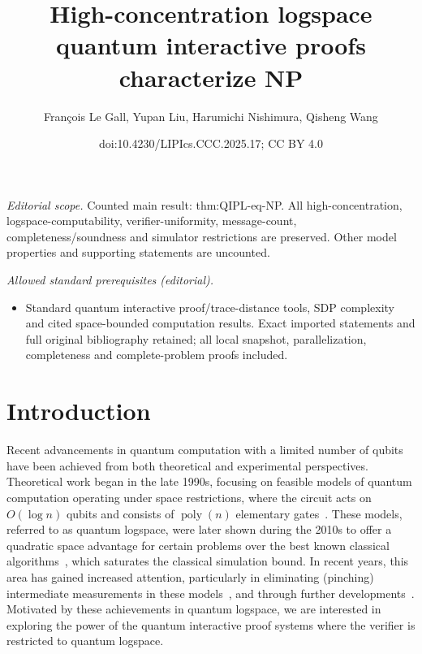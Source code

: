 \documentclass[10pt,a4paper]{article}
\title{High-concentration logspace quantum interactive proofs characterize NP}
\author{François Le Gall, Yupan Liu, Harumichi Nishimura, Qisheng Wang}
\date{doi:10.4230/LIPIcs.CCC.2025.17; CC BY 4.0}
\numberwithin{equation}{section}
\numberwithin{figure}{section}
\DeclareMathOperator\poly{poly}
\begin{document}
\maketitle
\noindent\textit{Editorial scope.} Counted main result: thm:QIPL-eq-NP. All high-concentration, logspace-computability, verifier-uniformity, message-count, completeness/soundness and simulator restrictions are preserved. Other model properties and supporting statements are uncounted.\par\medskip
\noindent\textit{Allowed standard prerequisites (editorial).}\begin{itemize}
\item Standard quantum interactive proof/trace-distance tools, SDP complexity and cited space-bounded computation results. Exact imported statements and full original bibliography retained; all local snapshot, parallelization, completeness and complete-problem proofs included.
\end{itemize}\medskip
\section{Introduction}

Recent advancements in quantum computation with a limited number of qubits have been achieved from both theoretical and experimental perspectives. Theoretical work began in the late 1990s, focusing on feasible models of quantum computation operating under space restrictions, where the circuit acts on $O(\log n)$ qubits and consists of $\poly(n)$ elementary gates~\cite{Wat99,Wat03}. These models, referred to as quantum logspace, were later shown during the 2010s to offer a quadratic space advantage for certain problems over the best known classical algorithms~\cite{TS13,FL18}, which saturates the classical simulation bound. In recent years, this area has gained increased attention, particularly in eliminating (pinching) intermediate measurements in these models~\cite{FR21,GRZ21}, and through further developments~\cite{GR22,Zhandry24}. Motivated by these achievements in quantum logspace, we are interested in exploring the power of the quantum interactive proof systems where the verifier is restricted to quantum logspace. 
\end{document}
